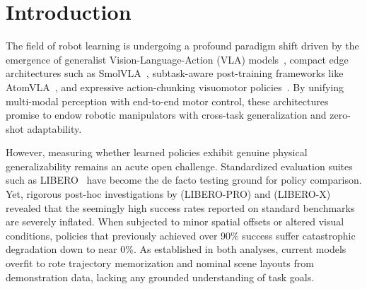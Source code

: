 \documentclass[conference]{IEEEtran}
\begin{document}
\IEEEpeerreviewmaketitle

\section{Introduction}
\label{sec:intro}

The field of robot learning is undergoing a profound paradigm shift driven by the emergence of generalist Vision-Language-Action (VLA) models~\cite{kim2024openvla, octo2023, padalkar2023openx}, compact edge architectures such as SmolVLA~\cite{smolvla2025}, subtask-aware post-training frameworks like AtomVLA~\cite{atomvla2025}, and expressive action-chunking visuomotor policies~\cite{chi2023diffusion, zhao2023act}. By unifying multi-modal perception with end-to-end motor control, these architectures promise to endow robotic manipulators with cross-task generalization and zero-shot adaptability. 

However, measuring whether learned policies exhibit genuine physical generalizability remains an acute open challenge. Standardized evaluation suites such as LIBERO~\cite{liu2023libero} have become the de facto testing ground for policy comparison. Yet, rigorous post-hoc investigations by \citet{zhou2026liberopro} (LIBERO-PRO) and \citet{wang2026liberox} (LIBERO-X) revealed that the seemingly high success rates reported on standard benchmarks are severely inflated. When subjected to minor spatial offsets or altered visual conditions, policies that previously achieved over 90\% success suffer catastrophic degradation down to near 0\%. As established in both analyses, current models overfit to rote trajectory memorization and nominal scene layouts from demonstration data, lacking any grounded understanding of task goals.
\end{document}
